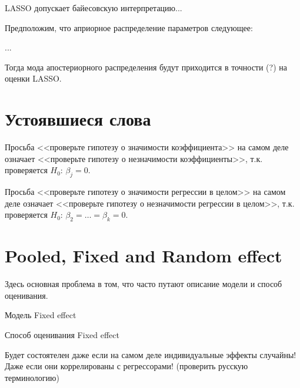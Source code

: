 \documentclass[pdftex,12pt,a4paper]{article}
\begin{document}
LASSO допускает байесовскую интерпретацию...

Предположим, что априорное распределение параметров следующее:

...


Тогда мода апостериорного распределения будут приходится в точности (?) на оценки LASSO.




\section{Устоявшиеся слова}

Просьба <<проверьте гипотезу о значимости коэффициента>> на самом деле означает <<проверьте гипотезу о незначимости коэффициенты>>, т.к. проверяется $H_0$: $\beta_j=0$.

Просьба <<проверьте гипотезу о значимости регрессии в целом>> на самом деле означает <<проверьте гипотезу о незначимости регрессии в целом>>, т.к. проверяется $H_0$: $\beta_2=\ldots=\beta_k=0$.



\section{Pooled, Fixed and Random effect}

Здесь основная проблема в том, что часто путают описание модели и способ оценивания.


Модель Fixed effect


Способ оценивания Fixed effect

Будет состоятелен даже если на самом деле индивидуальные эффекты случайны! Даже если они коррелированы с регрессорами! (проверить русскую терминологию)
\end{document}
